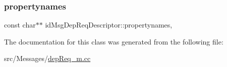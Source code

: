 \subsubsection{\texorpdfstring{propertynames}{propertynames}}
{\footnotesize\ttfamily const char$\ast$$\ast$ id\+Msg\+Dep\+Req\+Descriptor\+::propertynames\hspace{0.3cm}{\ttfamily [mutable]}, {\ttfamily [private]}}



The documentation for this class was generated from the following file\+:\begin{DoxyCompactItemize}
\item 
src/\+Messages/\hyperlink{depReq__m_8cc}{dep\+Req\+\_\+m.\+cc}\end{DoxyCompactItemize}

